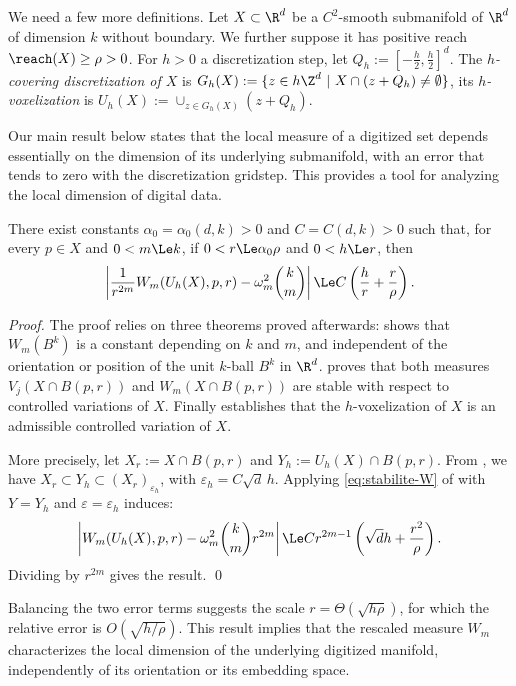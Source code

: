 We need a few more definitions. Let $X \subset \R^d$ be a $C^2$-smooth
submanifold of $\R^d$ of dimension $k$ without boundary. We further
suppose it has positive reach $\reach(X)\geq \rho>0$. For $h>0$ a
discretization step, let $Q_h:= \left[-\frac{h}{2},
  \frac{h}{2}\right]^d$. The \emph{$h$-covering discretization of $X$}
is $G_h(X) := \{ z \in h\Z^d~|~X \cap (z+Q_h) \neq \emptyset \}$, its
\emph{$h$-voxelization} is $U_h(X) := \cup_{z \in G_h(X)} (z + Q_h)$.

Our main result below states that the local measure of a digitized set
depends essentially on the dimension of its underlying submanifold,
with an error that tends to zero with the discretization
gridstep. This provides a tool for analyzing the local dimension of
digital data.
\begin{theorem}
\label{thm:main}
There exist constants $\alpha_0=\alpha_0(d,k)>0$ and $C=C(d,k)>0$ such that, for every $p \in X$ and $0<m\Le k$, if $0<r\Le\alpha_0\rho$ and $0<h\Le r$, then
\begin{align}\label{eq:main}
  \left| \frac{1}{r^{2m}}W_m(U_h(X),p,r) - \omega_m^2\binom{k}{m} \right|
  \Le  C \left( \frac{h}{r} + \frac{r}{\rho} \right).
\end{align}
\end{theorem}
\begin{proof}
  The proof relies on three theorems proved afterwards:
   shows that $W_m(B^k)$ is a constant
  depending on $k$ and $m$, and independent of the orientation or
  position of the unit $k$-ball $B^k$ in
  $\R^d$.  proves that both
  measures $V_j(X \cap B(p,r))$ and $W_m(X \cap B(p,r))$ are stable
  with respect to controlled variations of $X$. Finally
   establishes that the
  $h$-voxelization of $X$ is an admissible controlled variation of
  $X$.

  More precisely, let $X_r:= X \cap B(p,r)$ and $Y_h:=U_h(X) \cap
  B(p,r)$. From , we have $X_r
  \subset Y_h \subset (X_r)_{\varepsilon_h}$, with
  $\varepsilon_h=C\sqrt d\,h$. Applying \eqref{eq:stabilite-W} of
   with $Y=Y_h$ and
  $\varepsilon=\varepsilon_h$ induces:
  \begin{equation*}
    \left| W_m(U_h(X),p,r)-\omega_m^2\binom{k}{m}r^{2m} \right|
    \Le C r^{2m-1} \left( \sqrt{d} h+\frac{r^2}{\rho} \right).
  \end{equation*}
  Dividing by $r^{2m}$ gives the result.
  \qed
\end{proof}
Balancing the two error terms suggests the scale
$r=\Theta(\sqrt{h\rho})$, for which the relative error is
$O(\sqrt{h/\rho})$. This result implies that the
rescaled measure $W_m$ characterizes the local dimension of the
underlying digitized manifold, independently of its orientation or its
embedding space.

